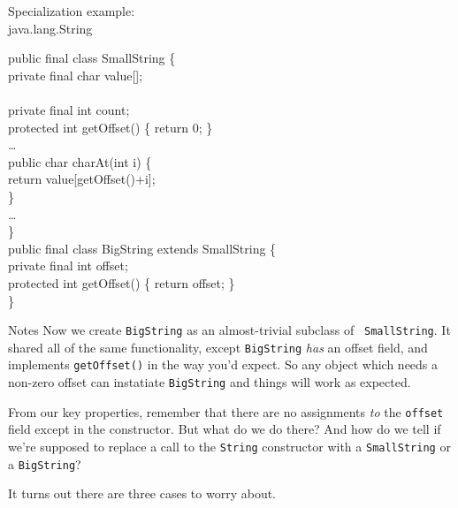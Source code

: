 \documentclass[%
pdf,
colorBG,
slideColor,
nototal,
oqe
]{prosper}
\renewcommand{\yellow}{\colC}
\newenvironment{talknotes}{\begin{slide}{Notes}\tiny}{\end{slide}}
\begin{document}
\begin{slide}{Specialization example:\\\small java.lang.String}
\fontsize{9}{9}%
\bfseries\begin{samplecode}%
public final class {\yellow SmallString} \{\\
\>private final char value[];\\
\>\\  
\>private final int count;\\
\>protected int getOffset() \{ return 0; \}\\
\>\ldots\\
\>public char charAt(int i) \{\\
\>\>return value[getOffset()+i];\\
\>\}\\
\>\ldots\\
\}\\
public final class {\yellow BigString extends SmallString} \{\\
\>private final int {\yellow offset};\\
\>protected int {\yellow getOffset()} \{ return offset; \}\\
\}\\
\end{samplecode}
\end{slide}

\begin{talknotes}
Now we create {\tt BigString} as an almost-trivial subclass of {\tt
  SmallString}.  It shared all of the same functionality, except
{\tt BigString} \emph{has} an offset field, and implements
{\tt getOffset()} in the way you'd expect.  So any object which
needs a non-zero offset can instatiate {\tt BigString} and things will
work as expected.

From our key properties, remember that there are no assignments
\emph{to} the {\tt offset} field except in the constructor.
But what do we do there?  And how do we tell if we're supposed
to replace a call to the {\tt String} constructor with a
{\tt SmallString} or a {\tt BigString}?

It turns out there are three cases to worry about.
\end{talknotes}
\end{document}
